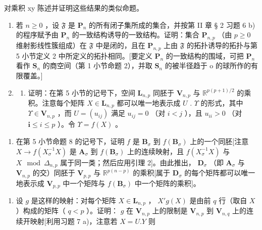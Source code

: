 对乘积 xy 陈述并证明这些结果的类似命题。

\begin{enumerate}
\def\labelenumi{\arabic{enumi})}
\setcounter{enumi}{5}
\item
  若 \(n \geqslant 0\) ，设 \(\mathfrak{F}\) 是 \(\mathbf{P}_n\) 的所有闭子集所成的集合，并按第 II 章 § 2 习题 6 b) 的程序赋予由 \(\mathbf{P}_n\) 的一致结构诱导的一致结构。证明：集合 \(\mathbf{P}_{n,p}\) （由 \(p \geqslant 0\) 维射影线性簇组成）在 \(\mathfrak{F}\) 中是闭的，且在 \(\mathbf{P}_{n,p}\) 上由 \(\mathfrak{F}\) 的拓扑诱导的拓扑与第 5 小节定义 2 中所定义的拓扑相同。{[}要定义 \(\mathbf{P}_n\) 的一致结构的围域，可把 \(\mathbf{P}_n\) 看作 \(\mathbf{S}_n\) 的商空间（第 1 小节命题 2），并取 \(\mathbf{S}_n\) 的被半径趋于 o 的球所作的有限覆盖。{]}
\item
  \begin{enumerate}
  \def\labelenumii{\alph{enumii})}
  \tightlist
  \item
    证明：在第 5 小节的记号下，空间 \(\mathbf{L}_{n,p}\) 同胚于 \(\mathbf{V}_{n,p}\) 与 \(\mathbb{R}^{p(p+1)/2}\) 的乘积。注意每个矩阵 \(X\in\mathbf{L}_{n,p}\) 都可以唯一地表示成 \(U\) . \(\Upsilon\) 的形式，其中 \(\Upsilon\in\mathbf{V}_{n,p}\) ，而 \(U=(u_{ij})\) 满足 \(u_{ij}=0\) （对 \(i<j\) ），且 \(u_{ii}>0\) （对 \(\mathbf{i}\leqslant i\leqslant p\) ）。令 \(\Upsilon=f(X)\) 。
  \end{enumerate}
\end{enumerate}

\begin{enumerate}
\def\labelenumi{\alph{enumi})}
\setcounter{enumi}{1}
\tightlist
\item
  在第 5 小节命题 8 的记号下，证明 \(f\) 是 \(\mathbf{B}_{\sigma}\) 到 \(f(\mathbf{B}_{\sigma})\) 上的一个同胚{[}注意 \(X \to f(X_{\sigma}^{-1}X)\) 是 \(\mathbf{A}_{\sigma}\) 到 \(f(\mathbf{B}_{\sigma})\) 上的连续映射，且 \(f(X_{\sigma}^{-1}X)\) 与 \(X \mod \Delta_{n,p}\) 属于同一类；然后应用引理 2{]}。由此推出， \(\mathbf{D}_{\sigma}\) （即 \(\mathbf{A}_{\sigma}\) 与 \(\mathbf{V}_{n,p}\) 的交）同胚于 \(\mathbf{V}_{p,p}\) 与 \(\mathbb{R}^{p(n - p)}\) 的乘积{[}属于 \(\mathbf{D}_{\sigma}\) 的每个矩阵都可以唯一地表示成 \(\mathbf{V}_{p,p}\) 中一个矩阵与 \(f(\mathbf{B}_{\sigma})\) 中一个矩阵的乘积{]}。
\end{enumerate}

\begin{enumerate}
\def\labelenumi{\arabic{enumi})}
\setcounter{enumi}{7}
\tightlist
\item
  设 \(g\) 是这样的映射：对每个矩阵 \(X \in \mathbf{L}_{n,p}\) ， \(X'g(X)\) 是由前 \(q\) 行（取自 \(X\) ）构成的矩阵（ \(q < p\) ）。证明： \(g\) 在 \(\mathbf{V}_{n,p}\) 上的限制是 \(\mathbf{V}_{n,p}\) 到 \(\mathbf{V}_{n,q}\) 上的连续开映射{[}利用习题 7 a)，注意若 \(X = U.Y\) 则
\end{enumerate}

